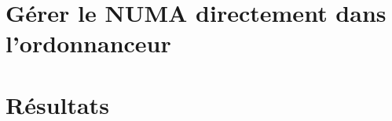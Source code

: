 \documentclass[oneside,12t]{classes/Thesis}
\begin{document}
\section{Gérer le NUMA directement dans l'ordonnanceur}




\section{Résultats}







\end{document}
